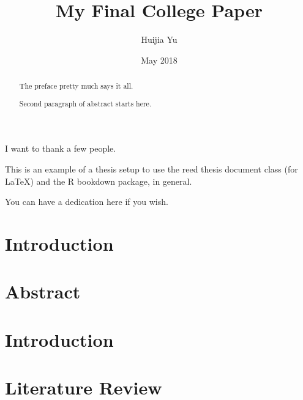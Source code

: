 \documentclass[12pt,twoside]{dukestatscithesis}
\title{My Final College Paper}
\author{Huijia Yu}
\date{May 2018}
\theoremstyle{definition}
\theoremstyle{definition}
\theoremstyle{definition}
\theoremstyle{remark}
\begin{document}
  \maketitle

\frontmatter %
\pagestyle{empty} %
  \begin{acknowledgements}
    I want to thank a few people.
  \end{acknowledgements}
  \begin{preface}
    This is an example of a thesis setup to use the reed thesis document
    class (for LaTeX) and the R bookdown package, in general.
  \end{preface}
  \hypersetup{linkcolor=black}
  \setcounter{tocdepth}{2}
  \tableofcontents

  \listoftables

  \listoffigures
  \begin{abstract}
    The preface pretty much says it all. \par
    
    Second paragraph of abstract starts here.
  \end{abstract}
  \begin{dedication}
    You can have a dedication here if you wish.
  \end{dedication}
\mainmatter %
\pagestyle{fancyplain} %

\chapter*{Introduction}\label{introduction}

\chapter{Abstract}\label{abstract}

\chapter{Introduction}\label{intro}

\chapter{Literature Review}\label{lit-review}
\end{document}
